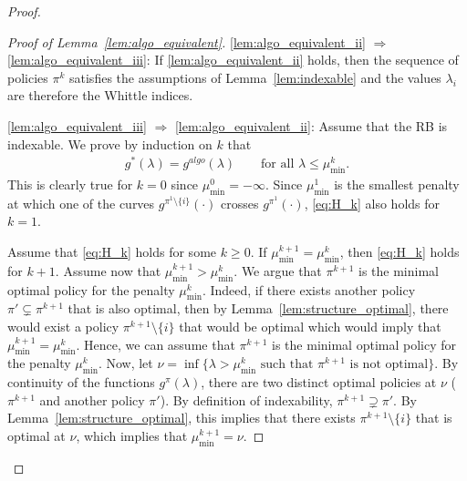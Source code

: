 \documentclass[acmsmall,screen,anonymous]{acmart}
\begin{document}
\begin{proof}
\begin{proof}[Proof of Lemma~\ref{lem:algo_equivalent}]
        \noindent
        \ref{lem:algo_equivalent_ii} $\Rightarrow$  \ref{lem:algo_equivalent_iii}: If \ref{lem:algo_equivalent_ii} holds, then the sequence of policies $\pi^k$ satisfies the assumptions of Lemma~\ref{lem:indexable} and the values $\lambda_i$ are therefore the Whittle indices.

        \noindent
        \ref{lem:algo_equivalent_iii}  $\Rightarrow$ \ref{lem:algo_equivalent_ii}: Assume that the RB is indexable. We prove by induction on $k$ that
        \begin{align}\label{eq:H_k}
            g^{*}(\lambda)=g^{algo}(\lambda) \qquad \text{for all $\lambda\le\mu^k_{\min}$.}
        \end{align}
        This is clearly true for $k=0$ since $\mu^0_{\min}=-\infty$. Since $\mu^1_{\min}$ is the smallest penalty at which one of the curves $g^{\pi^1\setminus\{i\}}(\cdot)$ crosses $g^{\pi^1}(\cdot)$, \eqref{eq:H_k} also holds for $k=1$.
        
        Assume that \eqref{eq:H_k} holds for some $k\ge0$. If $\mu^{k+1}_{\min}=\mu^k_{\min}$, then \eqref{eq:H_k} holds for $k+1$. Assume now that $\mu^{k+1}_{\min}>\mu^k_{\min}$. We argue that $\pi^{k+1}$ is the minimal optimal policy for the penalty $\mu^k_{\min}$. Indeed, if there exists another policy $\pi'\subsetneq\pi^{k+1}$ that is also optimal, then by Lemma~\ref{lem:structure_optimal}, there would exist a policy $\pi^{k+1}\setminus\{i\}$ that would be optimal which would imply that $\mu^{k+1}_{\min}=\mu^k_{\min}$. Hence, we can assume that $\pi^{k+1}$ is the minimal optimal policy for the penalty $\mu^k_{\min}$. Now, let  $\nu=\inf\{\lambda > \mu^k_{\min} \text{ such that }\pi^{k+1}\text{ is not optimal}\}$. By continuity of the functions $g^\pi(\lambda)$, there are two distinct optimal policies at $\nu$ ($\pi^{k+1}$ and another policy $\pi'$). By definition of indexability, $\pi^{k+1}\supsetneq\pi'$. By Lemma~\ref{lem:structure_optimal}, this implies that there exists $\pi^{k+1}\setminus\{i\}$ that is optimal at $\nu$, which implies that $\mu^{k+1}_{\min}=\nu$.
    

\end{proof}
\end{proof}
\end{document}
